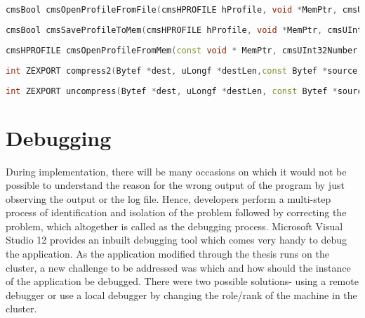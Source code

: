 \begin{lstlisting}[language=C++,label={lst:OpenProfileFromFile},caption={Open profile from File}]
cmsBool cmsOpenProfileFromFile(cmsHPROFILE hProfile, void *MemPtr, cmsUInt32Number* BytesNeeded);
\end{lstlisting} 

\begin{lstlisting}[language=C++,label={lst:SaveProfileToMem},caption={Save profile to Memory}]
cmsBool cmsSaveProfileToMem(cmsHPROFILE hProfile, void *MemPtr, cmsUInt32Number* BytesNeeded);
\end{lstlisting} 

\begin{lstlisting}[language=C++,label={lst:OpenProfileFromMem},caption={Open profile from Memory}]
cmsHPROFILE cmsOpenProfileFromMem(const void * MemPtr, cmsUInt32Number dwSize);
\end{lstlisting} 

\begin{lstlisting}[language=C++,label={lst:compress2},caption={API to compress the data}]
int ZEXPORT compress2(Bytef *dest, uLongf *destLen,const Bytef *source, uLong sourceLen, int level);
\end{lstlisting} 

\begin{lstlisting}[language=C++,label={lst:uncompress},caption={API to uncompress the data}]																	
int ZEXPORT uncompress(Bytef *dest, uLongf *destLen, const Bytef *source, uLong sourceLen);															
\end{lstlisting} 																	

\section{Debugging}

During implementation, there will be many occasions on which it would not be possible to understand the reason for the wrong output of the program by just observing the output or the log file. Hence, developers perform a multi-step process of identification and isolation of the problem followed by correcting the problem, which altogether is called as the debugging process. Microsoft Visual Studio 12 provides an inbuilt debugging tool which comes very handy to debug the application. 
As the application modified through the thesis runs on the cluster, a new challenge to be addressed was which and how should the instance of the application be debugged. There were two possible solutions- using a remote debugger or use a local debugger by changing the role/rank of the machine in the cluster. \newline

